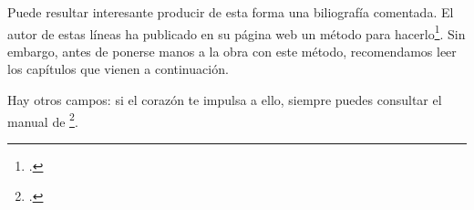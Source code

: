 \begin{plusloins}
Puede resultar interesante producir de esta forma una biliografía
comentada. El autor de estas líneas ha publicado en su página web un
método para hacerlo\footcite{biblio_commentee}. Sin embargo, antes de
ponerse manos a la obra con este método, recomendamos leer los
capítulos que vienen a continuación.
\end{plusloins}

Hay otros campos: si el corazón te impulsa a ello, siempre puedes
consultar el manual de \footcite{biblatex_champs}.
